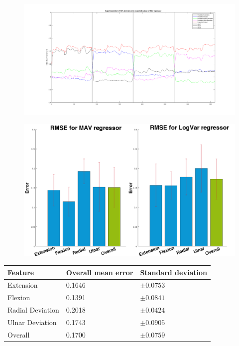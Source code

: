 \begin{figure}[H]
	\includegraphics[width=1\textwidth]{figures/results/SuperPoisonMavNewData}  %
	\caption{}
	\label{fig:SuperPoisonMavNewData}  %
\end{figure}


\begin{figure}[H]
	\includegraphics[width=1\textwidth]{figures/results/RMSEBarPlotNewData}  %
	\caption{}
	\label{fig:RMSEBarPlotNewData}  %
\end{figure}

	\begin{center}
		\begin{tabular}{l l l}
			\toprule
			\textbf{Feature} & \textbf{Overall mean error} & \textbf{Standard deviation}\\
			\midrule
			Extension & 0.1646 & $\pm 0.0753$ \\
			Flexion & 0.1391 & $\pm 0.0841$ \\
			Radial Deviation & 0.2018 & $\pm 0.0424$ \\
			Ulnar Deviation & 0.1743 & $\pm 0.0905$ \\
			Overall & 0.1700 & $\pm 0.0759$ \\
			\bottomrule
		\end{tabular}
	\end{center}
	
